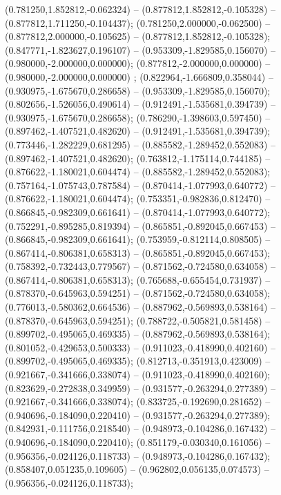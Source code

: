  (0.781250,1.852812,-0.062324) -- (0.877812,1.852812,-0.105328) -- (0.877812,1.711250,-0.104437);
 (0.781250,2.000000,-0.062500) -- (0.877812,2.000000,-0.105625) -- (0.877812,1.852812,-0.105328);
 (0.847771,-1.823627,0.196107) -- (0.953309,-1.829585,0.156070) -- (0.980000,-2.000000,0.000000);
 (0.877812,-2.000000,0.000000) -- (0.980000,-2.000000,0.000000) ;
 (0.822964,-1.666809,0.358044) -- (0.930975,-1.675670,0.286658) -- (0.953309,-1.829585,0.156070);
 (0.802656,-1.526056,0.490614) -- (0.912491,-1.535681,0.394739) -- (0.930975,-1.675670,0.286658);
 (0.786290,-1.398603,0.597450) -- (0.897462,-1.407521,0.482620) -- (0.912491,-1.535681,0.394739);
 (0.773446,-1.282229,0.681295) -- (0.885582,-1.289452,0.552083) -- (0.897462,-1.407521,0.482620);
 (0.763812,-1.175114,0.744185) -- (0.876622,-1.180021,0.604474) -- (0.885582,-1.289452,0.552083);
 (0.757164,-1.075743,0.787584) -- (0.870414,-1.077993,0.640772) -- (0.876622,-1.180021,0.604474);
 (0.753351,-0.982836,0.812470) -- (0.866845,-0.982309,0.661641) -- (0.870414,-1.077993,0.640772);
 (0.752291,-0.895285,0.819394) -- (0.865851,-0.892045,0.667453) -- (0.866845,-0.982309,0.661641);
 (0.753959,-0.812114,0.808505) -- (0.867414,-0.806381,0.658313) -- (0.865851,-0.892045,0.667453);
 (0.758392,-0.732443,0.779567) -- (0.871562,-0.724580,0.634058) -- (0.867414,-0.806381,0.658313);
 (0.765688,-0.655454,0.731937) -- (0.878370,-0.645963,0.594251) -- (0.871562,-0.724580,0.634058);
 (0.776013,-0.580362,0.664536) -- (0.887962,-0.569893,0.538164) -- (0.878370,-0.645963,0.594251);
 (0.788722,-0.505821,0.581458) -- (0.899702,-0.495065,0.469335) -- (0.887962,-0.569893,0.538164);
 (0.801052,-0.429653,0.500333) -- (0.911023,-0.418990,0.402160) -- (0.899702,-0.495065,0.469335);
 (0.812713,-0.351913,0.423009) -- (0.921667,-0.341666,0.338074) -- (0.911023,-0.418990,0.402160);
 (0.823629,-0.272838,0.349959) -- (0.931577,-0.263294,0.277389) -- (0.921667,-0.341666,0.338074);
 (0.833725,-0.192690,0.281652) -- (0.940696,-0.184090,0.220410) -- (0.931577,-0.263294,0.277389);
 (0.842931,-0.111756,0.218540) -- (0.948973,-0.104286,0.167432) -- (0.940696,-0.184090,0.220410);
 (0.851179,-0.030340,0.161056) -- (0.956356,-0.024126,0.118733) -- (0.948973,-0.104286,0.167432);
 (0.858407,0.051235,0.109605) -- (0.962802,0.056135,0.074573) -- (0.956356,-0.024126,0.118733);
